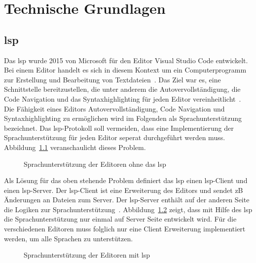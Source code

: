 \chapter{Technische Grundlagen}\label{ch:technical-basics}

\section{\acs{lsp}}

Das \ac{lsp} wurde 2015 von Microsoft für den Editor Visual Studio Code entwickelt.
Bei einem Editor handelt es sich in diesem Kontext um ein Computerprogramm zur Erstellung und Bearbeitung von Textdateien~\cite{editor-definition}.
Das Ziel war es, eine Schnittstelle bereitzustellen, die unter anderem die Autovervollständigung, die Code Navigation und das Syntaxhighlighting
für jeden Editor vereinheitlicht~\cite{lsp-witekio}.
Die Fähigkeit eines Editors Autovervollständigung, Code Navigation und Syntaxhighlighting zu ermöglichen wird im Folgenden als Sprachunterstützung bezeichnet.
Das \ac{lsp}-Protokoll soll vermeiden, dass eine Implementierung der Sprachunterstützung für jeden Editor seperat durchgeführt werden muss.
Abbildung~\ref{fig:without-lsp} veranschaulicht dieses Problem.

\begin{figure}[htp] %
    \centering
    \caption{Sprachunterstützung der Editoren ohne das \acs{lsp}}
    \label{fig:without-lsp}
\end{figure}

Als Lösung für das oben stehende Problem definiert das \ac{lsp} einen \ac{lsp}-Client und einen \ac{lsp}-Server.
Der \ac{lsp}-Client ist eine Erweiterung des Editors und sendet \ac{zB} Änderungen an Dateien zum Server.
Der \ac{lsp}-Server enthält auf der anderen Seite die Logiken zur Sprachunterstützung~\cite{lsp-witekio}.
Abbildung~\ref{fig:with-lsp} zeigt, dass mit Hilfe des \ac{lsp} die Sprachunterstützung nur einmal auf Server Seite entwickelt wird.
Für die verschiedenen Editoren muss folglich nur eine Client Erweiterung implementiert werden, um alle Sprachen zu unterstützen.

\begin{figure}[htp] %
    \centering
    \caption{Sprachunterstützung der Editoren mit \acs{lsp}}
    \label{fig:with-lsp}
\end{figure}


